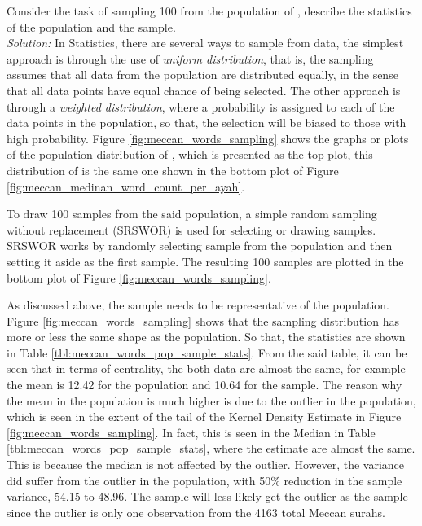 \begin{exmpx}\label{ex:population_sample_distribution_meccan_words}
Consider the task of sampling 100   from the population of , describe the statistics of the population and the sample.\\
\textit{Solution:} In Statistics, there are several ways to sample from data, the simplest approach is through the use of \textit{uniform distribution}, that is, the sampling assumes that all data from the population are distributed equally, in the sense that all data points have equal chance of being selected. The other approach is through a \textit{weighted distribution}, where a probability is assigned to each of the data points in the population, so that, the selection will be biased to those with high probability. Figure \ref{fig:meccan_words_sampling} shows the graphs or plots of the population distribution of  , which is presented as the top plot, this distribution of  is the same one shown in the bottom plot of Figure \ref{fig:meccan_medinan_word_count_per_ayah}. 

To draw 100 samples from the said population, a simple random sampling without replacement (SRSWOR) is used for selecting or drawing samples. SRSWOR works by randomly selecting sample from the population and then setting it aside as the first sample. The resulting 100 samples are plotted in the bottom plot of Figure \ref{fig:meccan_words_sampling}.

As discussed above, the sample needs to be representative of the population. Figure \ref{fig:meccan_words_sampling} shows that the sampling distribution has more or less the same shape as the population. So that, the statistics are shown in Table \ref{tbl:meccan_words_pop_sample_stats}. From the said table, it can be seen that in terms of centrality, the both data are almost the same, for example the mean is 12.42 for the population and 10.64 for the sample. The reason why the mean in the population is much higher is due to the outlier in the population, which is seen in the extent of the tail of the Kernel Density Estimate in Figure \ref{fig:meccan_words_sampling}. In fact, this is seen in the Median in Table \ref{tbl:meccan_words_pop_sample_stats}, where  the estimate are almost the same. This is because the median is not affected by the outlier. However, the variance did suffer from the outlier in the population, with 50\% reduction in the sample variance, 54.15 to 48.96. The sample will less likely get the outlier as the sample since the outlier is only one observation from the 4163 total Meccan surahs.


\end{exmpx}
